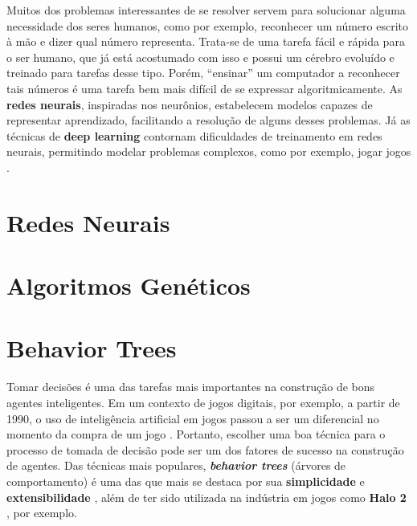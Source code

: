 Muitos dos problemas interessantes de se resolver servem para solucionar alguma
necessidade dos seres humanos, como por exemplo, reconhecer um número escrito à
mão e dizer qual número representa. Trata-se de uma tarefa fácil e rápida para
o ser humano, que já está acostumado com isso e possui um cérebro evoluído e
treinado para tarefas desse tipo. Porém, ``ensinar'' um computador a
reconhecer tais números é uma tarefa bem mais difícil de se expressar
algoritmicamente. As \textbf{redes neurais}, inspiradas nos neurônios,
estabelecem modelos capazes de representar aprendizado, facilitando a resolução
de alguns desses problemas. Já as técnicas de \textbf{deep learning}
\cite{DBLP:journals/corr/Schmidhuber14} contornam dificuldades de treinamento
em redes neurais, permitindo modelar problemas complexos, como por exemplo,
jogar jogos \cite{DBLP:journals/corr/MnihKSGAWR13}.


\section{\label{section:neural-networks}Redes Neurais}


\section{\label{section:environment}Algoritmos Genéticos}


\section{\label{section:behavior-trees}Behavior Trees}
Tomar decisões é uma das tarefas mais importantes na construção de bons agentes
inteligentes. Em um contexto de jogos digitais, por exemplo, a partir de 1990, o
uso de inteligência artificial em jogos passou a ser um diferencial no momento
da compra de um jogo \cite[Cap 1.]{Millington:2009:AIG:1795711}. Portanto,
escolher uma boa técnica para o processo de tomada de decisão pode ser um dos
fatores de sucesso na construção de agentes. Das técnicas mais populares,
\textit{\textbf{behavior trees}} (árvores de comportamento) é uma das que mais
se destaca por sua \textbf{simplicidade} e \textbf{extensibilidade} \cite[Cap.
4]{Rabin:2013:GAP:2566761}, além de ter sido utilizada na indústria em jogos
como \textbf{Halo 2} \cite[Cap.  5]{Millington:2009:AIG:1795711}, por exemplo.

